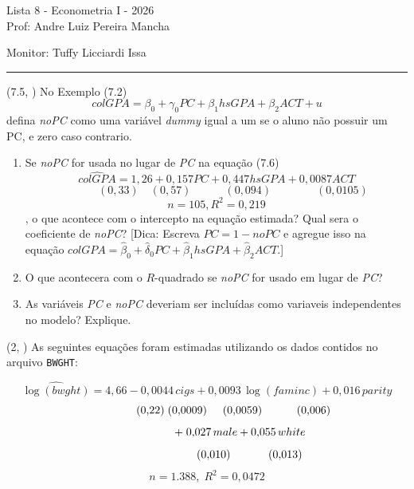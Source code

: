 \documentclass[12pt,letterpaper, onecolumn]{exam}
\begin{document}
\begingroup
    \centering
    \LARGE Lista 8 - Econometria I - 2026\\[0.5em]
    \large Prof: Andre Luiz Pereira Mancha \par
    \large Monitor: Tuffy Licciardi Issa \par
\endgroup
\rule{\textwidth}{0.4pt}
\pointsdroppedatright
\printanswers
\renewcommand{\solutiontitle}{\noindent\textbf{Ans:}\enspace}
\newcommand{\qstar}{\hspace{-0.6em}\textsuperscript{*}\hspace{0.2em}}

\begin{questions}

\question (7.5, \citep{wooldridge2016}) No Exemplo (7.2)
\[
colGPA = \beta_0 + \gamma_0PC + \beta_1hsGPA + \beta_2ACT + u
\]
defina \textit{noPC} como uma variável \textit{dummy} igual a um se o aluno não possuir um PC, e zero caso contrario.
\begin{enumerate}[label=(\roman*)]
    \item Se \textit{noPC} for usada no lugar de \textit{PC} na equação (7.6)
    \[
    \widehat{colGPA} = 1,26 + 0,157PC + 0,447hsGPA + 0,0087ACT
    \]
    \[
    \quad \quad \quad (0,33) \quad (0,57) \quad \quad \quad(0,094)  \quad  \quad \quad \quad (0,0105)
    \]
    \[
    n = 105, R^2 =0,219
    \]
    , o que acontece com o intercepto na equação estimada? Qual sera o coeficiente de \textit{noPC}? [Dica: Escreva \(PC = 1 - noPC\) e agregue isso na equação \(colGPA = \hat\beta_0 + \hat\delta_0 PC + \hat\beta_1 hsGPA + \hat\beta_2 ACT\).]
    \item O que acontecera com o \(R\)-quadrado se \textit{noPC} for usado em lugar de \textit{PC}?
    \item As variáveis \textit{PC} e \textit{noPC} deveriam ser incluídas como variaveis independentes no modelo? Explique.
\end{enumerate}

\vspace{0.7cm}

\question (2, \citep{wooldridge2016}) As seguintes equações foram estimadas utilizando os dados contidos no arquivo \texttt{BWGHT}:

\[
\widehat{\log(bwght)} = 4{,}66 - 0{,}0044\,cigs + 0{,}0093\,\log(faminc) + 0{,}016\,parity
\]
\[
\hspace{1.7cm} (0{,}22)\;(0{,}0009)\hspace{0.5cm}(0{,}0059)\hspace{1.1cm}(0{,}006)
\]
\[
\hspace{2.1cm} +\; 0{,}027\,male + 0{,}055\,white
\]
\[
\hspace{2.7cm} (0{,}010)\hspace{1.2cm}(0{,}013)
\]
\[
n = 1{.}388,\; R^2 = 0{,}0472
\]


\end{questions}
\end{document}
